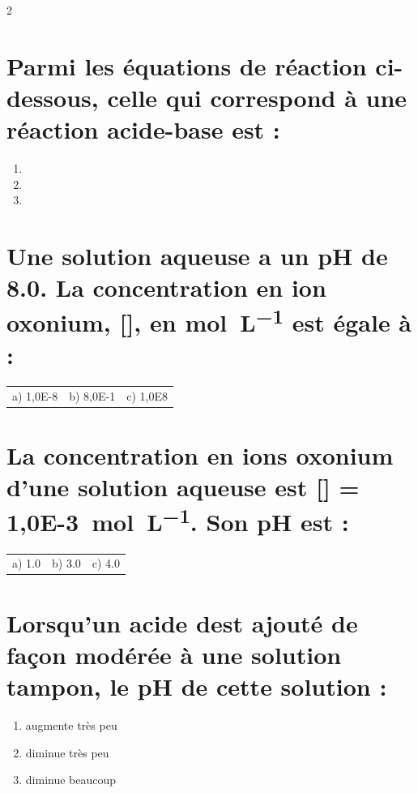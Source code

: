 \documentclass[a4paper,11pt,fleqn]{scrartcl}%
\begin{document}
\begin{multicols}{2}
\section{Parmi les équations de réaction ci-dessous, celle qui correspond à une réaction acide-base est :}
\begin{enumerate}
    \item {}
    \item {}
    \item {}
\end{enumerate}

\section{Une solution aqueuse a un pH de \num{8,0}. La concentration en ion oxonium, [], en \unit{\mole\per\liter} est égale à :}
\begin{tabular}{m{.25\linewidth}m{.25\linewidth}m{.25\linewidth}}
    a) \num{1,0E-8} & b) \num{8,0E-1} & c) \num{1,0E8}\\
\end{tabular}


\section{La concentration en ions oxonium d'une solution aqueuse est [] = \SI{1,0E-3}{\mole\per\liter}. Son pH est :}
\begin{tabular}{m{.25\linewidth}m{.25\linewidth}m{.25\linewidth}}
    a) \num{1,0} & b) \num{3,0} & c) \num{4,0}\\
\end{tabular}

\section{Lorsqu'un acide dest ajouté de façon modérée à une solution tampon, le pH de cette solution :}
\begin{enumerate}
    \item augmente très peu
    \item diminue très peu
    \item diminue beaucoup
\end{enumerate}


\end{multicols}
\end{document}
